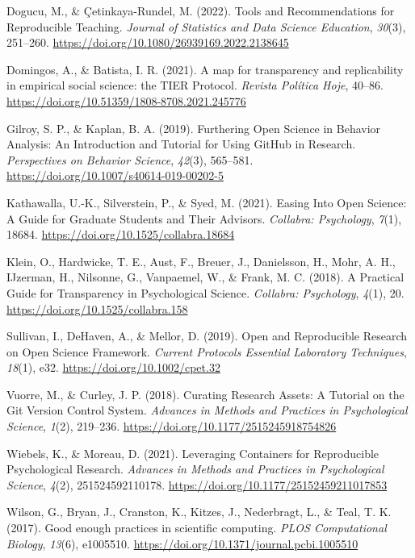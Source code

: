 \documentclass[
  a4paper,
]{article}
\newlength{\cslhangindent}
\newenvironment{CSLReferences}[2] %
 {\begin{list}{}{%
  \setlength{\itemindent}{0pt}
  \setlength{\leftmargin}{0pt}
  \setlength{\parsep}{0pt}
  \ifodd #1
   \setlength{\leftmargin}{\cslhangindent}
   \setlength{\itemindent}{-1\cslhangindent}
  \fi
  \setlength{\itemsep}{#2\baselineskip}}}
 {\end{list}}
\begin{document}
\label{refs}
\begin{CSLReferences}{1}{0}
Dogucu, M., \& Çetinkaya-Rundel, M. (2022). Tools and Recommendations
for Reproducible Teaching. \emph{Journal of Statistics and Data Science
Education}, \emph{30}(3), 251--260.
\url{https://doi.org/10.1080/26939169.2022.2138645}

Domingos, A., \& Batista, I. R. (2021). A map for transparency and
replicability in empirical social science: the TIER Protocol.
\emph{Revista Política Hoje}, 40--86.
\url{https://doi.org/10.51359/1808-8708.2021.245776}

Gilroy, S. P., \& Kaplan, B. A. (2019). Furthering Open Science in
Behavior Analysis: An Introduction and Tutorial for Using GitHub in
Research. \emph{Perspectives on Behavior Science}, \emph{42}(3),
565--581. \url{https://doi.org/10.1007/s40614-019-00202-5}

Kathawalla, U.-K., Silverstein, P., \& Syed, M. (2021). Easing Into Open
Science: A Guide for Graduate Students and Their Advisors.
\emph{Collabra: Psychology}, \emph{7}(1), 18684.
\url{https://doi.org/10.1525/collabra.18684}

Klein, O., Hardwicke, T. E., Aust, F., Breuer, J., Danielsson, H., Mohr,
A. H., IJzerman, H., Nilsonne, G., Vanpaemel, W., \& Frank, M. C.
(2018). A Practical Guide for Transparency in Psychological Science.
\emph{Collabra: Psychology}, \emph{4}(1), 20.
\url{https://doi.org/10.1525/collabra.158}

Sullivan, I., DeHaven, A., \& Mellor, D. (2019). Open and Reproducible
Research on Open Science Framework. \emph{Current Protocols Essential
Laboratory Techniques}, \emph{18}(1), e32.
\url{https://doi.org/10.1002/cpet.32}

Vuorre, M., \& Curley, J. P. (2018). Curating Research Assets: A
Tutorial on the Git Version Control System. \emph{Advances in Methods
and Practices in Psychological Science}, \emph{1}(2), 219--236.
\url{https://doi.org/10.1177/2515245918754826}

Wiebels, K., \& Moreau, D. (2021). Leveraging Containers for
Reproducible Psychological Research. \emph{Advances in Methods and
Practices in Psychological Science}, \emph{4}(2), 251524592110178.
\url{https://doi.org/10.1177/25152459211017853}

Wilson, G., Bryan, J., Cranston, K., Kitzes, J., Nederbragt, L., \&
Teal, T. K. (2017). Good enough practices in scientific computing.
\emph{PLOS Computational Biology}, \emph{13}(6), e1005510.
\url{https://doi.org/10.1371/journal.pcbi.1005510}

\end{CSLReferences}
\end{document}
